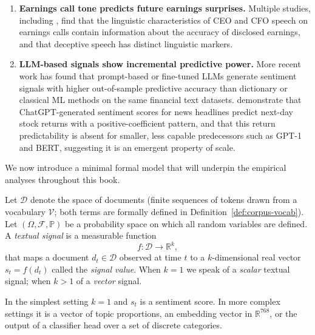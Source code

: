 \begin{context}
\begin{enumerate}
  \item \textbf{Earnings call tone predicts future earnings surprises.}  Multiple
    studies, including \citet{larcker2012detecting}, %
    find that the linguistic characteristics of CEO and CFO speech on earnings calls
    contain information about the accuracy of disclosed earnings, and that deceptive
    speech has distinct linguistic markers.

  \item \textbf{LLM-based signals show incremental predictive power.}  More recent work
    has found that prompt-based or fine-tuned LLMs generate sentiment signals with
    higher out-of-sample predictive accuracy than dictionary or classical ML methods on
    the same financial text datasets.  \citet{LopezLiraTang2023}
    demonstrate that ChatGPT-generated sentiment scores for news headlines predict
    next-day stock returns with a positive-coefficient pattern, and that this return
    predictability is absent for smaller, less capable predecessors such as GPT-1 and
    BERT, suggesting it is an emergent property of scale.
\end{enumerate}

We now introduce a minimal formal model that will underpin the empirical analyses
throughout this book.

\begin{definition}
\label{def:textual-signal}
Let $\mathcal{D}$ denote the space of documents (finite sequences of tokens drawn from
a vocabulary $\mathcal{V}$; both terms are formally defined in
Definition~\ref{def:corpus-vocab}).  Let $(\Omega, \mathcal{F}, \mathbb{P})$ be a
probability space on which all random variables are defined.  A \emph{textual signal} is a
measurable function
\[
  f \colon \mathcal{D} \to \mathbb{R}^k,
\]
that maps a document $d_t \in \mathcal{D}$ observed at time $t$ to a $k$-dimensional
real vector $s_t = f(d_t)$ called the \emph{signal value}.  When $k = 1$ we speak of a
\emph{scalar} textual signal; when $k > 1$ of a \emph{vector} signal.
\end{definition}

In the simplest setting $k = 1$ and $s_t$ is a sentiment score.  In more complex
settings it is a vector of topic proportions, an embedding vector in $\mathbb{R}^{768}$,
or the output of a classifier head over a set of discrete categories.


\end{context}
